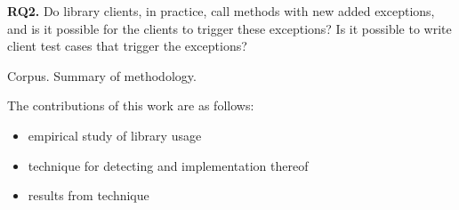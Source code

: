 \noindent
{\bf RQ2.} Do library clients, in practice, call methods with new added exceptions, and is it possible for the clients to trigger these exceptions? Is it possible to write client test cases that trigger the exceptions?

\vspace*{1em}

Corpus. Summary of methodology.

The contributions of this work are as follows: 

\begin{itemize}[noitemsep]
\item empirical study of library usage
\item technique for detecting and implementation thereof
  \item results from technique
\end{itemize}



